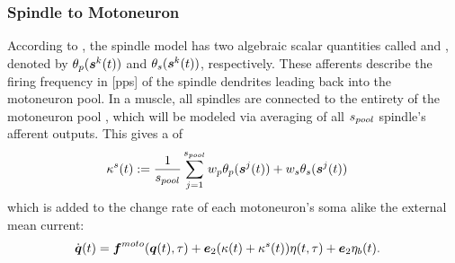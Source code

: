 \subsubsection{Spindle to Motoneuron}
According to \cite{Mileusnic2006}, the spindle model has two algebraic scalar quantities called  and ,
denoted by $\theta_p(\boldsymbol{s}^k(t))$ and $\theta_s(\boldsymbol{s}^k(t))$, respectively.
These afferents describe the firing frequency in [pps] of the spindle dendrites leading back into the motoneuron pool.
In a muscle, all spindles are connected to the entirety of the motoneuron pool , which will be modeled via averaging of all ${s_{pool}}$ spindle's afferent outputs.
This gives a  of
\begin{align}
	\kappa^s(t) &:= \frac{1}{{s_{pool}}}\sum\limits_{j=1}^{{s_{pool}}} w_p\theta_p(\boldsymbol{s}^j(t)) + w_s\theta_s(\boldsymbol{s}^j(t))
\end{align}
which is added to the change rate of each motoneuron's soma alike the external mean current:
\begin{align}
	\dot{\boldsymbol{q}}(t) &= \boldsymbol{f}^{moto}(\boldsymbol{q}(t),\tau) + \boldsymbol{e}_2(\kappa(t) + \kappa^s(t))\eta(t,\tau) + \boldsymbol{e}_2\eta_b(t).\label{def:motosys_plus_spindle}
\end{align}    

